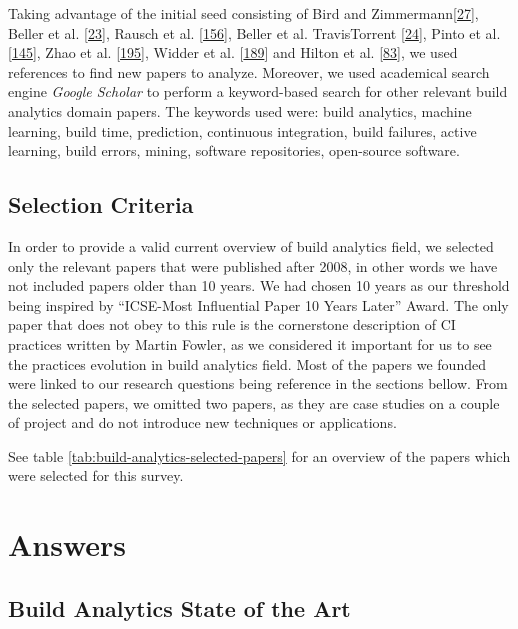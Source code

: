 \documentclass[]{book}
\begin{document}
Taking advantage of the initial seed consisting of Bird and
Zimmermann{[}\protect\hyperlink{ref-bird2017predicting}{27}{]}, Beller
et al. {[}\protect\hyperlink{ref-beller2017oops}{23}{]}, Rausch et al.
{[}\protect\hyperlink{ref-rausch2017empirical}{156}{]}, Beller et al.
TravisTorrent {[}\protect\hyperlink{ref-beller2017travistorrent}{24}{]},
Pinto et al. {[}\protect\hyperlink{ref-pinto2018work}{145}{]}, Zhao et
al. {[}\protect\hyperlink{ref-zhao2017impact}{195}{]}, Widder et al.
{[}\protect\hyperlink{ref-widder2018m}{189}{]} and Hilton et al.
{[}\protect\hyperlink{ref-hilton2016usage}{83}{]}, we used references to
find new papers to analyze. Moreover, we used academical search engine
\emph{Google Scholar} to perform a keyword-based search for other
relevant build analytics domain papers. The keywords used were: build
analytics, machine learning, build time, prediction, continuous
integration, build failures, active learning, build errors, mining,
software repositories, open-source software.

\subsection{Selection Criteria}\label{selection-criteria}

In order to provide a valid current overview of build analytics field,
we selected only the relevant papers that were published after 2008, in
other words we have not included papers older than 10 years. We had
chosen 10 years as our threshold being inspired by ``ICSE-Most
Influential Paper 10 Years Later'' Award. The only paper that does not
obey to this rule is the cornerstone description of CI practices written
by Martin Fowler, as we considered it important for us to see the
practices evolution in build analytics field. Most of the papers we
founded were linked to our research questions being reference in the
sections bellow. From the selected papers, we omitted two papers, as
they are case studies on a couple of project and do not introduce new
techniques or applications.

See table \ref{tab:build-analytics-selected-papers} for an overview of
the papers which were selected for this survey.

\section{Answers}\label{answers}

\subsection{Build Analytics State of the
Art}\label{build-analytics-state-of-the-art}
\end{document}
